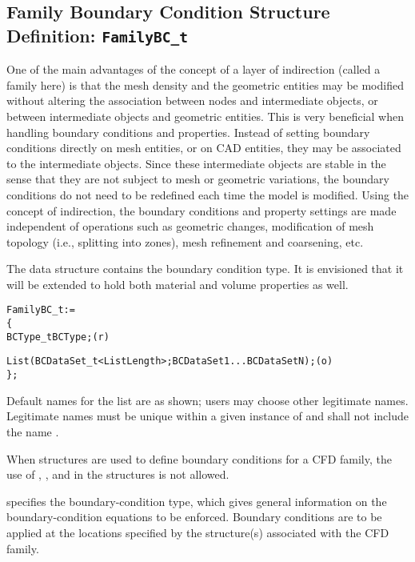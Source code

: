 \subsection{Family Boundary Condition Structure Definition: \texttt{FamilyBC\_t}}
\label{s:FamilyBC}

One of the main advantages of the concept of a layer of indirection
(called a family here) is that the mesh density and the geometric
entities may be modified without altering the association between
nodes and intermediate objects, or between intermediate objects and
geometric entities.
This is very beneficial when handling boundary conditions and properties.
Instead of setting boundary conditions directly on mesh entities,
or on CAD entities, they may be associated to the intermediate objects.
Since these intermediate objects are stable in the sense that they are
not subject to mesh or geometric variations, the boundary conditions
do not need to be redefined each time the model is modified.
Using the concept of indirection, the boundary conditions and property
settings are made independent of operations such as geometric changes,
modification of mesh topology (i.e., splitting into zones), mesh
refinement and coarsening, etc.

The  data structure contains the boundary condition type.
It is envisioned that it will be extended to hold both material and
volume properties as well.

\begin{alltt}
  FamilyBC\_t :=
    \{
    BCType\_t BCType;                                                        (r)

    List( BCDataSet\_t<ListLength>; BCDataSet1 ... BCDataSetN ) ;            (o)
    \} ;
\end{alltt}

\begin{notes}
\item Default names for the  list are as shown; users
      may choose other legitimate names.
      Legitimate names must be unique within a given instance of
       and shall not include the name .
\item When  structures are used to define boundary
      conditions for a CFD family, the use of ,
      , and  in the 
      structures is not allowed.
\end{notes}

 specifies the boundary-condition type, which gives general
information on the boundary-condition equations to be enforced.
Boundary conditions are to be applied at the locations specified by the
 structure(s) associated with the CFD family.


